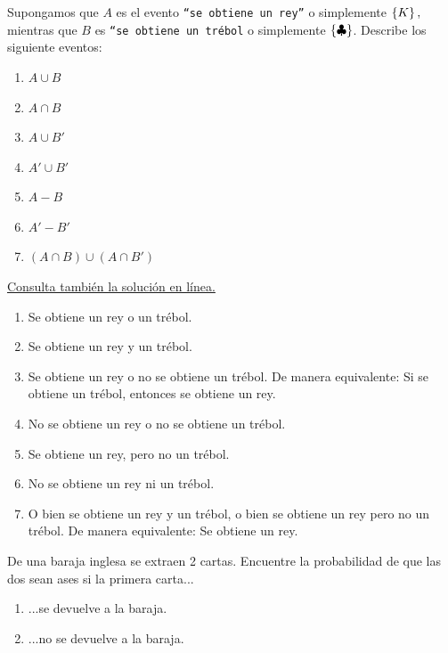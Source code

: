 \begin{problema}
	\label{problema:2.2}
	Supongamos que $A$ es el evento \texttt{``se obtiene un rey''} o simplemente $\left\{ K \right\},$ mientras que $B$ es \texttt{``se obtiene un tr\'ebol} o simplemente $\left\{ \clubsuit \right\}$. Describe los siguiente eventos: 
	\begin{enumerate}
		\item $A\cup B$ 
		\item $A\cap B$ 
		\item $A \cup B'$ 
		\item $A' \cup B'$ 
		\item $A - B$ 
		\item $A'-B'$ 
		\item $(A\cap B) \cup (A\cap B')$
	\end{enumerate}
\end{problema}

\begin{solucion}
	\label{solucion:2.2}
	\href{https://youtu.be/S9VFhMWVyu4}{Consulta también la solución en línea.}
	\begin{enumerate}
		\item Se obtiene un rey o un trébol.
		\item Se obtiene un rey y un trébol.
		\item Se obtiene un rey o no se obtiene un trébol. De manera equivalente: Si se obtiene un trébol, entonces se obtiene un rey. 
		\item No se obtiene un rey o no se obtiene un trébol.
		\item Se obtiene un rey, pero no un trébol. 
		\item No se obtiene un rey ni un trébol.
		\item O bien se obtiene un rey y un trébol, o bien se obtiene un rey pero no un trébol. De manera equivalente: Se obtiene un rey.		
	\end{enumerate}
\end{solucion}



\begin{problema}
	\label{problema:2.3}
	De una baraja inglesa se extraen 2 cartas. Encuentre la probabilidad de que las dos sean ases si la primera carta...
	\begin{enumerate}
		\item ...se devuelve a la baraja.
		\item ...no se devuelve a la baraja.
	\end{enumerate}
	
\end{problema}

